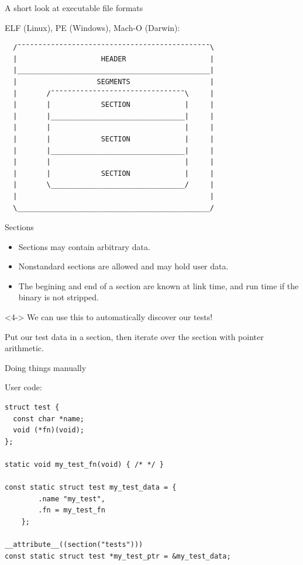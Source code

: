 \documentclass[10pt]{beamer}
\begin{document}
\begin{frame}[fragile]{A short look at executable file formats}

  ELF (Linux), PE (Windows), Mach-O (Darwin):
  \begin{verbatim}
  /¯¯¯¯¯¯¯¯¯¯¯¯¯¯¯¯¯¯¯¯¯¯¯¯¯¯¯¯¯¯¯¯¯¯¯¯¯¯¯¯¯¯¯¯¯¯\
  |                    HEADER                    |
  |______________________________________________|
  |                   SEGMENTS                   |
  |       /¯¯¯¯¯¯¯¯¯¯¯¯¯¯¯¯¯¯¯¯¯¯¯¯¯¯¯¯¯¯¯¯\     |
  |       |            SECTION             |     |
  |       |________________________________|     |
  |       |                                |     |
  |       |            SECTION             |     |
  |       |________________________________|     |
  |       |                                |     |
  |       |            SECTION             |     |
  |       \________________________________/     |
  |                                              |
  \______________________________________________/
  \end{verbatim}
\end{frame}

\begin{frame}[fragile]{Sections}

  \begin{itemize}[<+-|alert@+>]
    \item Sections may contain arbitrary data.
    \item Nonstandard sections are allowed and may hold user data.
    \item The begining and end of a section are known at link time,
          and run time if the binary is not stripped.
  \end{itemize}

  \begin{onlyenv}<4->
  We can use this to automatically discover our tests!

  Put our test data in a section, then iterate over the section with pointer
  arithmetic.
  \end{onlyenv}

\end{frame}

\begin{frame}[fragile]{Doing things manually}

  User code:
  \begin{lstlisting}
struct test {
  const char *name;
  void (*fn)(void);
};

static void my_test_fn(void) { /* */ }

const static struct test my_test_data = {
        .name "my_test",
        .fn = my_test_fn
    };

__attribute__((section("tests")))
const static struct test *my_test_ptr = &my_test_data;

  \end{lstlisting}

\end{frame}
\end{document}
